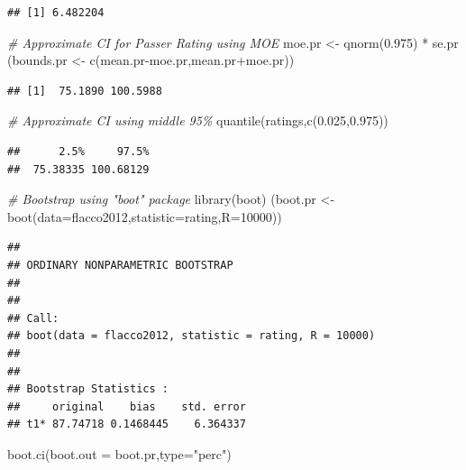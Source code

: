 \documentclass[
  11pt,
]{book}
\newenvironment{Shaded}{\begin{snugshade}}{\end{snugshade}}
\newcommand{\AttributeTok}[1]{\textcolor[rgb]{0.77,0.63,0.00}{#1}}
\newcommand{\CommentTok}[1]{\textcolor[rgb]{0.56,0.35,0.01}{\textit{#1}}}
\newcommand{\DecValTok}[1]{\textcolor[rgb]{0.00,0.00,0.81}{#1}}
\newcommand{\FloatTok}[1]{\textcolor[rgb]{0.00,0.00,0.81}{#1}}
\newcommand{\FunctionTok}[1]{\textcolor[rgb]{0.00,0.00,0.00}{#1}}
\newcommand{\NormalTok}[1]{#1}
\newcommand{\OtherTok}[1]{\textcolor[rgb]{0.56,0.35,0.01}{#1}}
\newcommand{\SpecialCharTok}[1]{\textcolor[rgb]{0.00,0.00,0.00}{#1}}
\newcommand{\StringTok}[1]{\textcolor[rgb]{0.31,0.60,0.02}{#1}}
\theoremstyle{definition}
\theoremstyle{definition}
\theoremstyle{definition}
\theoremstyle{definition}
\theoremstyle{remark}
\begin{document}
\begin{verbatim}
## [1] 6.482204
\end{verbatim}

\begin{Shaded}
\begin{Highlighting}[]
\CommentTok{\# Approximate CI for Passer Rating using MOE}
\NormalTok{moe.pr }\OtherTok{\textless{}{-}} \FunctionTok{qnorm}\NormalTok{(}\FloatTok{0.975}\NormalTok{) }\SpecialCharTok{*}\NormalTok{ se.pr}
\NormalTok{(bounds.pr }\OtherTok{\textless{}{-}} \FunctionTok{c}\NormalTok{(mean.pr}\SpecialCharTok{{-}}\NormalTok{moe.pr,mean.pr}\SpecialCharTok{+}\NormalTok{moe.pr))}
\end{Highlighting}
\end{Shaded}

\begin{verbatim}
## [1]  75.1890 100.5988
\end{verbatim}

\begin{Shaded}
\begin{Highlighting}[]
\CommentTok{\# Approximate CI using middle 95\%}
\FunctionTok{quantile}\NormalTok{(ratings,}\FunctionTok{c}\NormalTok{(}\FloatTok{0.025}\NormalTok{,}\FloatTok{0.975}\NormalTok{))}
\end{Highlighting}
\end{Shaded}

\begin{verbatim}
##      2.5%     97.5% 
##  75.38335 100.68129
\end{verbatim}

\begin{Shaded}
\begin{Highlighting}[]
\CommentTok{\# Bootstrap using "boot" package}
\FunctionTok{library}\NormalTok{(boot)}
\NormalTok{(boot.pr }\OtherTok{\textless{}{-}} \FunctionTok{boot}\NormalTok{(}\AttributeTok{data=}\NormalTok{flacco2012,}\AttributeTok{statistic=}\NormalTok{rating,}\AttributeTok{R=}\DecValTok{10000}\NormalTok{))}
\end{Highlighting}
\end{Shaded}

\begin{verbatim}
## 
## ORDINARY NONPARAMETRIC BOOTSTRAP
## 
## 
## Call:
## boot(data = flacco2012, statistic = rating, R = 10000)
## 
## 
## Bootstrap Statistics :
##     original    bias    std. error
## t1* 87.74718 0.1468445    6.364337
\end{verbatim}

\begin{Shaded}
\begin{Highlighting}[]
\FunctionTok{boot.ci}\NormalTok{(}\AttributeTok{boot.out =}\NormalTok{ boot.pr,}\AttributeTok{type=}\StringTok{"perc"}\NormalTok{)}
\end{Highlighting}
\end{Shaded}
\end{document}

